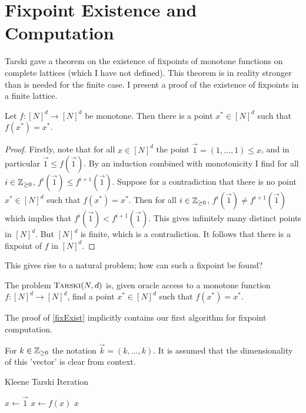 \section{Fixpoint Existence and Computation}
Tarski gave a theorem on the existence of fixpoints of monotone functions on complete lattices\citep{tarski} (which I have not defined). This theorem
is in reality stronger than is needed for the finite case. I present a proof of the existence of fixpoints in a finite lattice.
\begin{theorem}\label{fixExist}
  Let $f : [N]^d \to [N]^d$ be monotone. Then there is a point $x^* \in [N]^d$ such that $f(x^*) = x^*$.
\end{theorem}
\begin{proof}
  Firstly, note that for all $x \in [N]^d$ the point $\vec{1} = (1, ..., 1) \leq x$, and in particular $\vec{1} \leq f(\vec{1})$.
  By an induction combined with monotonicity I find for all $i \in \mathbb{Z}_{\geq 0}$, $f^i (\vec{1}) \leq f^{i+1} (\vec{1})$. Suppose for a contradiction that there
  is no point $x^* \in [N]^d$ such that $f(x^*) = x^*$. Then for all $i \in \mathbb{Z}_{\geq 0}$, $f^i (\vec{1}) \neq f^{i+1}(\vec{1})$ which implies
  that $f^i (\vec{1}) < f^{i+1}(\vec{1})$. This gives infinitely many distinct points in $[N]^d$. But $[N]^d$ is finite, which is a contradiction.
  It follows that
  there is a fixpoint of $f$ in $[N]^d$.
\end{proof}
This gives rise to a natural problem; how can such a fixpoint be found?
\begin{definition}[$\trsk$]
  The problem $\textsc{Tarski}(N, d)$ is, given oracle access to a monotone function $f : [N]^d \to [N]^d$, find a point $x^* \in [N]^d$ such that $f(x^*) = x^*$.
\end{definition}
The proof of \cref{fixExist} implicitly contains our first algorithm for fixpoint computation.
\begin{notation}
  For $k \in \mathbb{Z}_{\geq 0}$ the notation $\vec{k} = (k, ..., k)$. It is assumed that
  the dimensionality of this 'vector' is clear from context.
\end{notation}
\begin{algorithm}
  \caption{Kleene Tarski Iteration}
  \begin{algorithmic}[1]
  \State $x \gets \vec{1}$
    \State $x \gets f(x)$
  \EndWhile
  \Return $x$
  \EndProcedure
  \end{algorithmic}
\end{algorithm}

